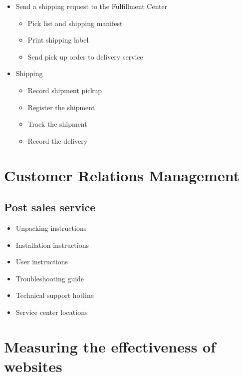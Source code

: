 \documentclass[]{book}
\providecommand{\tightlist}{%
  \setlength{\itemsep}{0pt}\setlength{\parskip}{0pt}}
\begin{document}
\begin{itemize}
\tightlist
\item
  Send a shipping request to the Fulfillment Center

  \begin{itemize}
  \tightlist
  \item
    Pick list and shipping manifest
  \item
    Print shipping label
  \item
    Send pick up order to delivery service
  \end{itemize}
\item
  Shipping

  \begin{itemize}
  \tightlist
  \item
    Record shipment pickup
  \item
    Register the shipment
  \item
    Track the shipment
  \item
    Record the delivery
  \end{itemize}
\end{itemize}

\hypertarget{customer-relations-management}{%
\section{Customer Relations Management}\label{customer-relations-management}}

\hypertarget{post-sales-service}{%
\subsection{Post sales service}\label{post-sales-service}}

\begin{itemize}
\tightlist
\item
  Unpacking instructions
\item
  Installation instructions
\item
  User instructions
\item
  Troubleshooting guide
\item
  Technical support hotline
\item
  Service center locations
\end{itemize}

\hypertarget{measuring-the-effectiveness-of-websites}{%
\section{Measuring the effectiveness of websites}\label{measuring-the-effectiveness-of-websites}}
\end{document}
